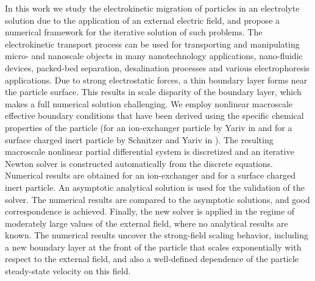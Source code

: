 \documentclass[MSc,beforeExam]{iitcsthesis}
\begin{document}





\maketitleEnglish

\abstractEnglish
In this work we study the electrokinetic 
migration of particles in an electrolyte solution 
due to the application of an external electric field,
and propose a numerical framework for the iterative solution of such problems.
The electrokinetic transport process can be used for
transporting and manipulating micro- and nanoscale objects in 
many nanotechnology applications, nano-fluidic devices, packed-bed separation, 
desalination processes and various electrophoresis applications.
Due to strong electrostatic forces, a thin boundary layer forms near the particle
surface. This results in scale disparity of the boundary layer, which makes a 
full numerical solution challenging. 
We employ nonlinear macroscale effective boundary conditions that have been derived
using the specific chemical properties of the particle
(for an ion-exchanger particle by Yariv in \cite{yariv2010migration}
and for a surface charged inert particle by Schnitzer and Yariv in \cite{schnitzer2012surface}).
The resulting macroscale nonlinear partial differential system 
is discretized and an iterative Newton solver is
constructed automatically from the discrete equations.
Numerical results are obtained for an ion-exchanger and 
for a surface charged inert particle. 
An asymptotic analytical solution is 
used for the validation of the solver. 
The numerical results are compared to the asymptotic solutions, 
and good correspondence is achieved.
Finally, the new solver is applied in the regime of moderately large values of the external field, where no analytical results are known. The numerical results uncover the strong-field scaling behavior, including a new boundary layer at the front of the particle that scales exponentially with respect to the external field, and also a well-defined dependence of the particle steady-state velocity on this field.
\end{document}
